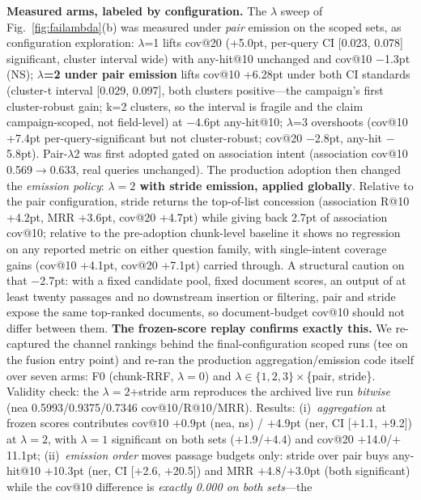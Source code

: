 \documentclass[sigconf,nonacm]{acmart}
\begin{document}
\textbf{Measured arms, labeled by configuration.} The $\lambda$ sweep
of Fig.~\ref{fig:failambda}(b) was measured under \emph{pair} emission
on the scoped sets, as configuration exploration: $\lambda$=1 lifts
cov@20 (+5.0pt, per-query CI [0.023, 0.078] significant, cluster
interval wide) with any-hit@10 unchanged and cov@10 $-$1.3pt (NS);
\textbf{$\lambda$=2 under pair emission} lifts cov@10 +6.28pt under
both CI standards (cluster-t interval [0.029, 0.097], both clusters
positive---the campaign's first cluster-robust gain; k=2 clusters, so
the interval is fragile and the claim campaign-scoped, not field-level)
at $-$4.6pt any-hit@10; $\lambda$=3 overshoots (cov@10 +7.4pt
per-query-significant but not cluster-robust; cov@20 $-$2.8pt, any-hit
$-$5.8pt). Pair-$\lambda$2 was first adopted gated on association
intent (association cov@10 0.569$\to$0.633, real queries unchanged).
The production adoption then changed the \emph{emission policy}:
\textbf{$\lambda{=}2$ with stride emission, applied globally}.
Relative to the pair configuration, stride returns the top-of-list
concession (association R@10 +4.2pt, MRR +3.6pt, cov@20 +4.7pt) while
giving back 2.7pt of association cov@10; relative to the pre-adoption
chunk-level baseline it shows no regression on any reported metric on
either question family, with single-intent coverage gains (cov@10
+4.1pt, cov@20 +7.1pt) carried through. A structural caution on that
$-$2.7pt: with a fixed candidate pool, fixed document scores, an output
of at least twenty passages and no downstream insertion or filtering,
pair and stride expose the same top-ranked documents, so
document-budget cov@10 should not differ between them. \textbf{The
frozen-score replay confirms exactly this.} We re-captured the channel
rankings behind the final-configuration scoped runs (tee on the fusion
entry point) and re-ran the production aggregation/emission code itself
over seven arms: F0 (chunk-RRF, $\lambda{=}0$) and
$\lambda\in\{1,2,3\}\times$\{pair, stride\}. Validity check: the
$\lambda{=}2$+stride arm reproduces the archived live run
\emph{bitwise} (nea 0.5993/0.9375/0.7346 cov@10/R@10/MRR). Results:
(i)~\emph{aggregation} at frozen scores contributes cov@10 $+$0.9pt
(nea, ns) / $+$4.9pt (ner, CI [$+$1.1, $+$9.2]) at $\lambda{=}2$,
with $\lambda{=}1$ significant on both sets ($+$1.9/$+$4.4) and
cov@20 $+$14.0/$+$11.1pt; (ii)~\emph{emission order} moves passage
budgets only: stride over pair buys any-hit@10 $+$10.3pt (ner, CI
[$+$2.6, $+$20.5]) and MRR $+$4.8/$+$3.0pt (both significant) while
the cov@10 difference is \emph{exactly 0.000 on both sets}---the
\end{document}
